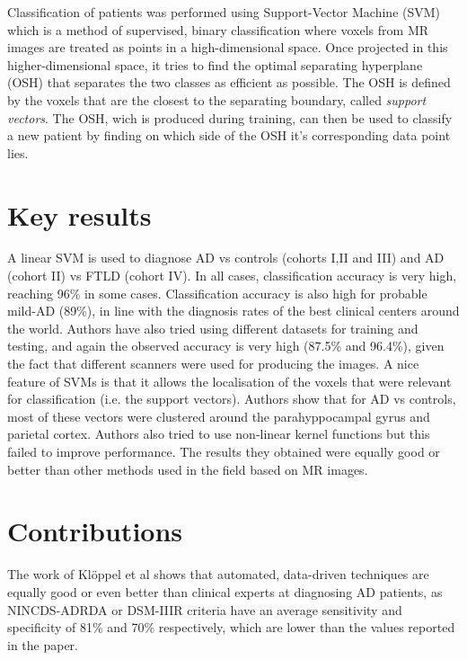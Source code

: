 \documentclass[11pt,a4paper,oneside]{report}
\begin{document}

Classification of patients was performed using Support-Vector Machine (SVM) which is a method of supervised, binary classification where voxels from MR images are treated as points in a high-dimensional space. Once projected in this higher-dimensional space, it tries to find the optimal separating hyperplane (OSH) that separates the two classes as efficient as possible. The OSH is defined by the voxels that are the closest to the separating boundary, called \emph{support vectors}. \cite{vapnik1998statistical,bishop2006pattern} The OSH, wich is produced during training, can then be used to classify a new patient by finding on which side of the OSH it's corresponding data point lies. 


\section*{Key results}

A linear SVM is used to diagnose AD vs controls (cohorts I,II and III) and AD (cohort II) vs FTLD (cohort IV). In all cases, classification accuracy is very high, reaching 96\% in some cases. Classification accuracy is also high for probable mild-AD (89\%), in line with the diagnosis rates of the best clinical centers around the world. Authors have also tried using different datasets for training and testing, and again the observed accuracy is very high (87.5\% and 96.4\%), given the fact that different scanners were used for producing the images. A nice feature of SVMs is that it allows the localisation of the voxels that were relevant for classification (i.e. the support vectors). Authors show that for AD vs controls, most of these vectors were clustered around the parahyppocampal gyrus and parietal cortex. Authors also tried to use non-linear kernel functions but this failed to improve performance. The results they obtained were equally good or better than other methods used in the field based on MR images. \cite{gosche2002hippocampal,jack2002antemortem,barnes2004differentiating,csernansky2004correlations,wahlund2005evidence} 

\section*{Contributions}

The work of Kl\"{o}ppel et al shows that automated, data-driven techniques are equally good or even better than clinical experts at diagnosing AD patients, as NINCDS-ADRDA or DSM-IIIR criteria have an average sensitivity and specificity of 81\% and 70\% respectively, which are lower than the values reported in the paper. \cite{knopman2001practice} 
\end{document}
